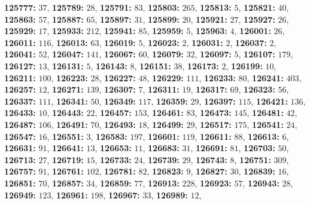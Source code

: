\textsf{\bfseries 125777:} $37$, \textsf{\bfseries 125789:} $28$, \textsf{\bfseries 125791:} $83$, \textsf{\bfseries 125803:} $265$, \textsf{\bfseries 125813:} $5$, \textsf{\bfseries 125821:} $40$, \textsf{\bfseries 125863:} $57$, \textsf{\bfseries 125887:} $65$, \textsf{\bfseries 125897:} $31$, \textsf{\bfseries 125899:} $20$, \textsf{\bfseries 125921:} $27$, \textsf{\bfseries 125927:} $26$, \textsf{\bfseries 125929:} $17$, \textsf{\bfseries 125933:} $212$, \textsf{\bfseries 125941:} $85$, \textsf{\bfseries 125959:} $5$, \textsf{\bfseries 125963:} $4$, \textsf{\bfseries 126001:} $26$, \textsf{\bfseries 126011:} $116$, \textsf{\bfseries 126013:} $63$, \textsf{\bfseries 126019:} $5$, \textsf{\bfseries 126023:} $2$, \textsf{\bfseries 126031:} $2$, \textsf{\bfseries 126037:} $2$, \textsf{\bfseries 126041:} $52$, \textsf{\bfseries 126047:} $141$, \textsf{\bfseries 126067:} $60$, \textsf{\bfseries 126079:} $32$, \textsf{\bfseries 126097:} $5$, \textsf{\bfseries 126107:} $179$, \textsf{\bfseries 126127:} $13$, \textsf{\bfseries 126131:} $5$, \textsf{\bfseries 126143:} $8$, \textsf{\bfseries 126151:} $38$, \textsf{\bfseries 126173:} $2$, \textsf{\bfseries 126199:} $10$, \textsf{\bfseries 126211:} $100$, \textsf{\bfseries 126223:} $28$, \textsf{\bfseries 126227:} $48$, \textsf{\bfseries 126229:} $111$, \textsf{\bfseries 126233:} $80$, \textsf{\bfseries 126241:} $403$, \textsf{\bfseries 126257:} $12$, \textsf{\bfseries 126271:} $139$, \textsf{\bfseries 126307:} $7$, \textsf{\bfseries 126311:} $19$, \textsf{\bfseries 126317:} $69$, \textsf{\bfseries 126323:} $56$, \textsf{\bfseries 126337:} $111$, \textsf{\bfseries 126341:} $50$, \textsf{\bfseries 126349:} $117$, \textsf{\bfseries 126359:} $29$, \textsf{\bfseries 126397:} $115$, \textsf{\bfseries 126421:} $136$, \textsf{\bfseries 126433:} $10$, \textsf{\bfseries 126443:} $22$, \textsf{\bfseries 126457:} $153$, \textsf{\bfseries 126461:} $83$, \textsf{\bfseries 126473:} $145$, \textsf{\bfseries 126481:} $42$, \textsf{\bfseries 126487:} $106$, \textsf{\bfseries 126491:} $70$, \textsf{\bfseries 126493:} $18$, \textsf{\bfseries 126499:} $29$, \textsf{\bfseries 126517:} $175$, \textsf{\bfseries 126541:} $24$, \textsf{\bfseries 126547:} $16$, \textsf{\bfseries 126551:} $3$, \textsf{\bfseries 126583:} $197$, \textsf{\bfseries 126601:} $119$, \textsf{\bfseries 126611:} $88$, \textsf{\bfseries 126613:} $6$, \textsf{\bfseries 126631:} $91$, \textsf{\bfseries 126641:} $13$, \textsf{\bfseries 126653:} $11$, \textsf{\bfseries 126683:} $31$, \textsf{\bfseries 126691:} $81$, \textsf{\bfseries 126703:} $50$, \textsf{\bfseries 126713:} $27$, \textsf{\bfseries 126719:} $15$, \textsf{\bfseries 126733:} $24$, \textsf{\bfseries 126739:} $29$, \textsf{\bfseries 126743:} $8$, \textsf{\bfseries 126751:} $309$, \textsf{\bfseries 126757:} $91$, \textsf{\bfseries 126761:} $102$, \textsf{\bfseries 126781:} $82$, \textsf{\bfseries 126823:} $9$, \textsf{\bfseries 126827:} $30$, \textsf{\bfseries 126839:} $16$, \textsf{\bfseries 126851:} $70$, \textsf{\bfseries 126857:} $34$, \textsf{\bfseries 126859:} $77$, \textsf{\bfseries 126913:} $228$, \textsf{\bfseries 126923:} $57$, \textsf{\bfseries 126943:} $28$, \textsf{\bfseries 126949:} $123$, \textsf{\bfseries 126961:} $198$, \textsf{\bfseries 126967:} $33$, \textsf{\bfseries 126989:} $12$, 
